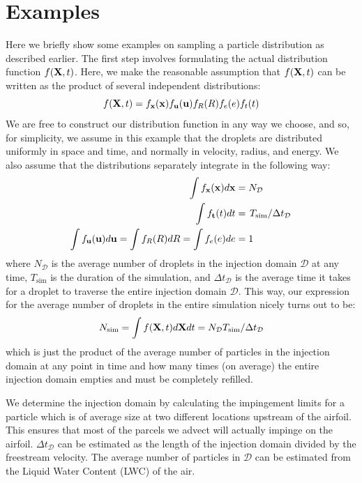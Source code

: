 \documentclass{article}
\begin{document}
\section{Examples}
Here we briefly show some examples on sampling a particle distribution as described earlier. The first step involves formulating 
the actual distribution function $f({\bf X},t)$. Here, we make the reasonable assumption that $f({\bf X},t)$ can be written as the 
product of several independent distributions: 
\begin{equation}
f({\bf X},t) = f_{{\bf x}}({\bf x})f_{{\bf u}}({\bf u})f_R(R)f_e(e)f_t(t)
\end{equation}
We are free to construct our distribution function in any way we choose, and so, for simplicity, we 
assume in this example that the droplets are distributed uniformly in space and time, and normally in velocity, radius, and 
energy. We also assume that the distributions separately integrate in the following way:
\begin{equation}
\begin{aligned}
\int f_{\bf x}({\bf x}) d{\bf x} & = N_{\mathcal{D}}  \\
\int f_{\bf t}(t) dt & = \left. T_{\text{sim}} \middle/ \Delta t_{\mathcal{D}} \right. \\
\int f_{\bf{u}}({\bf u}) d{\bf u} = \int f_R(R) dR = \int f_e(e) de & = 1
\end{aligned}
\end{equation}
where $N_{\mathcal{D}}$ is the average number of droplets in the injection domain $\mathcal{D}$ at any time, $T_{\text{sim}}$ 
is the duration of the simulation, and $\Delta t_{\mathcal{D}}$ is the average time it takes for a droplet to traverse 
the entire injection domain $\mathcal{D}$. This way, our expression for the average number of droplets in the entire simulation 
nicely turns out to be:
\begin{equation}
N_{\text{sim}} = \int f({\bf X},t) d{\bf X} dt = N_{\mathcal{D}} T_{\text{sim}}/\Delta t_{\mathcal{D}}
\end{equation}
which is just the product of the average number of particles in the injection domain at any point in time and how many times (on average) 
the entire injection domain empties and must be completely refilled.

We determine the injection domain by calculating the impingement limits for a particle which is of average size at two different 
locations upstream of the airfoil. This ensures that most of the parcels we advect will actually impinge on the airfoil. $\Delta t_{\mathcal{D}}$ 
can be estimated as the length of the injection domain divided by the freestream velocity. The average number of particles in 
$\mathcal{D}$ can be estimated from the Liquid Water Content (LWC) of the air.
\end{document}
